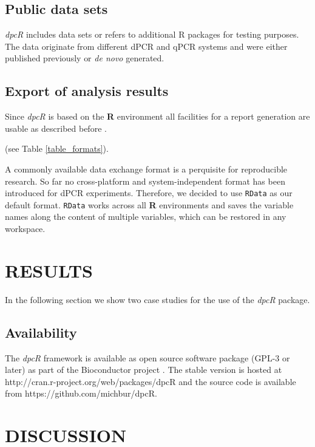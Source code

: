 \documentclass[a4,center,fleqn]{NAR}
\begin{document}
\subsection{Public data sets}

\textit{dpcR} includes data sets or refers to additional R packages for testing 
purposes. The data originate from different dPCR and qPCR systems and were 
either published previously \cite{whale_comparison_2012, roediger2015chippcr, 
white_digital_2009, rodiger_r_2015} or \textit{de novo} generated.

\subsection{Export of analysis results}

Since \textit{dpcR} is based on the \textbf{R} environment all facilities for a 
report generation are usable as described before \cite{rodiger_r_2015}.

(see Table \ref{table_formats}).

A commonly available data exchange format is a perquisite for reproducible 
research. So far no cross-platform and system-independent format has been 
introduced for dPCR experiments. Therefore, we decided to use \texttt{RData} as 
our default format. \texttt{RData} works across all \textbf{R} environments and 
saves the variable names along the content of multiple variables, which can be 
restored in any workspace.


\section{RESULTS}

In the following section we show two case studies for the use of the \textit{dpcR} package.

\subsection{Availability}

The \textit{dpcR} framework is available as open source software package (GPL-3 
or later) as part of the Bioconductor project \cite{gentleman_2004}. The stable 
version is hosted at http://cran.r-project.org/web/packages/dpcR and the source 
code is available from  https://github.com/michbur/dpcR.

\section{DISCUSSION}
\end{document}
